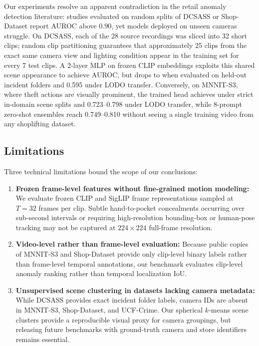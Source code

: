 \documentclass[pdflatex,sn-mathphys-num]{sn-jnl}
\begin{document}
Our experiments resolve an apparent contradiction in the retail anomaly detection literature: studies evaluated on random splits of DCSASS or Shop-Dataset report AUROC above 0.90, yet models deployed on unseen cameras struggle. On DCSASS, each of the 28 source recordings was sliced into 32 short clips; random clip partitioning guarantees that approximately 25 clips from the exact same camera view and lighting condition appear in the training set for every 7 test clips. A 2-layer MLP on frozen CLIP embeddings exploits this shared scene appearance to achieve \DCSASSRand{} AUROC, but drops to \DCSASSStr{} when evaluated on held-out incident folders and 0.595 under LODO transfer. Conversely, on MNNIT-S3, where theft actions are visually prominent, the trained head achieves \MNNITStr{} under strict in-domain scene splits and 0.723--0.798 under LODO transfer, while 8-prompt zero-shot ensembles reach 0.749--0.810 without seeing a single training video from any shoplifting dataset.

\subsection{Limitations}

Three technical limitations bound the scope of our conclusions:
\begin{enumerate}
    \item \textbf{Frozen frame-level features without fine-grained motion modeling:} We evaluate frozen CLIP and SigLIP frame representations sampled at $T=32$ frames per clip. Subtle hand-to-pocket concealments occurring over sub-second intervals or requiring high-resolution bounding-box or human-pose tracking may not be captured at $224 \times 224$ full-frame resolution.
    \item \textbf{Video-level rather than frame-level evaluation:} Because public copies of MNNIT-S3 and Shop-Dataset provide only clip-level binary labels rather than frame-level temporal annotations, our benchmark evaluates clip-level anomaly ranking rather than temporal localization IoU.
    \item \textbf{Unsupervised scene clustering in datasets lacking camera metadata:} While DCSASS provides exact incident folder labels, camera IDs are absent in MNNIT-S3, Shop-Dataset, and UCF-Crime. Our spherical $k$-means scene clusters provide a reproducible visual proxy for camera groupings, but releasing future benchmarks with ground-truth camera and store identifiers remains essential.
\end{enumerate}
\end{document}
